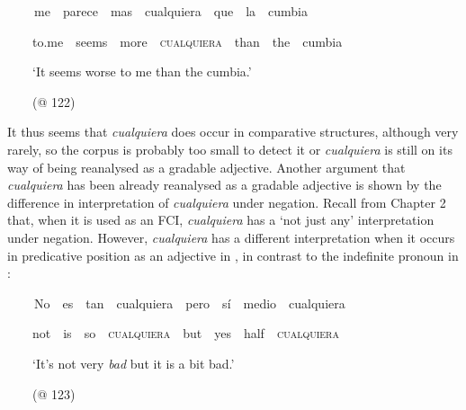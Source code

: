 \begin{styleStandard}
\textbf{\ \ }\ \ me\ \ parece\ \ mas\ \ cualquiera\ \ que\ \ la\ \ cumbia
\end{styleStandard}

\begin{styleStandard}
\ \ \ \ to.me\ \ seems\ \ more\ \ \textsc{cualquiera}\ \ than\ \ the\ \ cumbia
\end{styleStandard}

\begin{styleStandard}
\ \ \ \ ‘It seems worse to me than the cumbia.’
\end{styleStandard}

\begin{styleStandard}
\ \ \ \ (@ 122)
\end{styleStandard}

\begin{styleStandard}
It thus seems that \textit{cualquiera} does occur in comparative structures, although very rarely, so the corpus is probably too small to detect it or \textit{cualquiera} is still on its way of being reanalysed as a gradable adjective. Another argument that \textit{cualquiera} has been already reanalysed as a gradable adjective is shown by the difference in interpretation of \textit{cualquiera} under negation. Recall from Chapter 2 that, when it is used as an FCI, \textit{cualquiera} has a ‘not just any’ interpretation under negation. However, \textit{cualquiera} has a different interpretation when it occurs in predicative position as an adjective in , in contrast to the indefinite pronoun in : 
\end{styleStandard}

\begin{styleStandard}
\label{bkm:Ref63460902}\textbf{\ \ }\ \ No\ \ es\ \ tan\ \ cualquiera\ \ pero\ \ sí\ \ medio\ \ cualquiera
\end{styleStandard}

\begin{styleStandard}
\ \ \ \ not\ \ is\ \ so\ \ \textsc{cualquiera}\ \ but\ \ yes\ \ half\ \ \textsc{cualquiera}
\end{styleStandard}

\begin{styleStandard}
\ \ \ \ ‘It’s not very \textit{bad }but it is a bit bad.’
\end{styleStandard}

\begin{styleStandard}
\ \ \ \ (@ 123)
\end{styleStandard}

